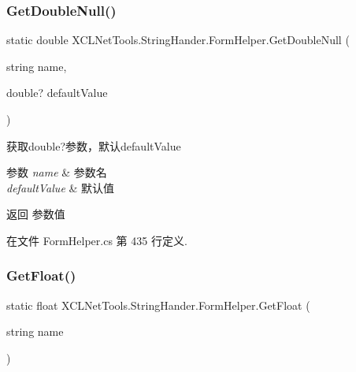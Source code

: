 \subsubsection{\texorpdfstring{Get\+Double\+Null()}{GetDoubleNull()}\hspace{0.1cm}{\footnotesize\ttfamily [2/2]}}
{\footnotesize\ttfamily static double X\+C\+L\+Net\+Tools.\+String\+Hander.\+Form\+Helper.\+Get\+Double\+Null (\begin{DoxyParamCaption}\item[{string}]{name,  }\item[{double?}]{default\+Value }\end{DoxyParamCaption})\hspace{0.3cm}{\ttfamily [static]}}



获取double?参数，默认default\+Value 


\begin{DoxyParams}{参数}
{\em name} & 参数名\\
\hline
{\em default\+Value} & 默认值\\
\hline
\end{DoxyParams}
\begin{DoxyReturn}{返回}
参数值
\end{DoxyReturn}


在文件 Form\+Helper.\+cs 第 435 行定义.

\mbox{\label{class_x_c_l_net_tools_1_1_string_hander_1_1_form_helper_a0807fb3fcdf5a5686fe0d8417013835a}} 
\subsubsection{\texorpdfstring{Get\+Float()}{GetFloat()}\hspace{0.1cm}{\footnotesize\ttfamily [1/2]}}
{\footnotesize\ttfamily static float X\+C\+L\+Net\+Tools.\+String\+Hander.\+Form\+Helper.\+Get\+Float (\begin{DoxyParamCaption}\item[{string}]{name }\end{DoxyParamCaption})\hspace{0.3cm}{\ttfamily [static]}}



